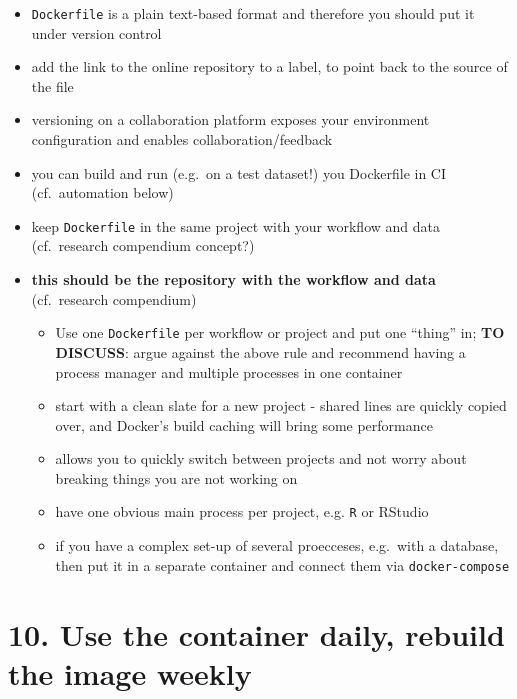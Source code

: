 \documentclass[10pt,letterpaper]{article}
\providecommand{\tightlist}{%
  \setlength{\itemsep}{0pt}\setlength{\parskip}{0pt}}
\begin{document}
\begin{itemize}
\tightlist
\item
  \texttt{Dockerfile} is a plain text-based format and therefore you
  should put it under version control
\item
  add the link to the online repository to a label, to point back to the
  source of the file
\item
  versioning on a collaboration platform exposes your environment
  configuration and enables collaboration/feedback
\item
  you can build and run (e.g.~on a test dataset!) you Dockerfile in CI
  (cf.~automation below)
\item
  keep \texttt{Dockerfile} in the same project with your workflow and
  data (cf.~research compendium concept?)
\item
  \textbf{this should be the repository with the workflow and data}
  (cf.~research compendium)

  \begin{itemize}
  \tightlist
  \item
    Use one \texttt{Dockerfile} per workflow or project and put one
    ``thing'' in; \textbf{TO DISCUSS}: argue against the above rule and
    recommend having a process manager and multiple processes in one
    container
  \item
    start with a clean slate for a new project - shared lines are
    quickly copied over, and Docker's build caching will bring some
    performance
  \item
    allows you to quickly switch between projects and not worry about
    breaking things you are not working on
  \item
    have one obvious main process per project, e.g. \texttt{R} or
    RStudio
  \item
    if you have a complex set-up of several proecceses, e.g.~with a
    database, then put it in a separate container and connect them via
    \texttt{docker-compose}
  \end{itemize}
\end{itemize}

\hypertarget{use-the-container-daily-rebuild-the-image-weekly}{%
\section*{10. Use the container daily, rebuild the image
weekly}\label{use-the-container-daily-rebuild-the-image-weekly}}
\end{document}
